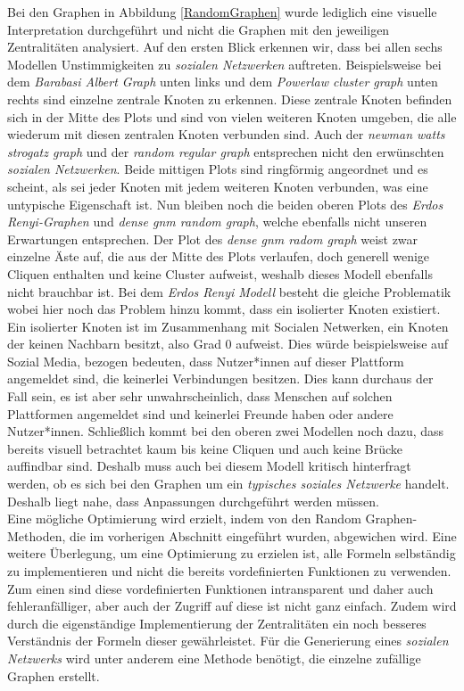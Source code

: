 Bei den Graphen in Abbildung \ref{RandomGraphen} wurde lediglich eine visuelle Interpretation durchgeführt und nicht die Graphen mit den jeweiligen Zentralitäten analysiert. Auf den ersten Blick erkennen wir, dass bei allen sechs Modellen Unstimmigkeiten zu \textit{sozialen Netzwerken} auftreten. Beispielsweise bei dem \textit{Barabasi Albert Graph} unten links und dem \textit{Powerlaw cluster graph} unten rechts sind einzelne zentrale Knoten zu erkennen. Diese zentrale Knoten befinden sich in der Mitte des Plots und sind von vielen weiteren Knoten umgeben, die alle wiederum mit diesen zentralen Knoten verbunden sind. Auch der \textit{newman watts strogatz graph} und der \textit{random regular graph} entsprechen nicht den erwünschten \textit{sozialen Netzwerken}. Beide mittigen Plots sind ringförmig angeordnet und es scheint, als sei jeder Knoten mit jedem weiteren Knoten verbunden, was eine untypische Eigenschaft ist. Nun bleiben noch die beiden oberen Plots des \textit{Erdos Renyi-Graphen} und \textit{dense gnm random graph}, welche ebenfalls nicht unseren Erwartungen entsprechen. Der Plot des \textit{dense gnm radom graph} weist zwar einzelne Äste auf, die aus der Mitte des Plots verlaufen, doch generell wenige Cliquen enthalten und keine Cluster aufweist, weshalb dieses Modell ebenfalls nicht brauchbar ist. Bei dem \textit{Erdos Renyi Modell} besteht die gleiche Problematik wobei hier noch das Problem hinzu kommt, dass ein isolierter Knoten existiert. Ein isolierter Knoten ist im Zusammenhang mit Socialen Netwerken, ein Knoten der keinen Nachbarn besitzt, also Grad $0$ aufweist.
Dies würde beispielsweise auf Sozial Media, bezogen bedeuten, dass Nutzer*innen auf dieser Plattform angemeldet sind, die keinerlei Verbindungen besitzen. Dies kann durchaus der Fall sein, es ist aber sehr unwahrscheinlich, dass Menschen auf solchen Plattformen angemeldet sind und keinerlei Freunde haben oder andere Nutzer*innen.
\newpage
Schließlich kommt bei den oberen zwei Modellen noch dazu, dass bereits visuell betrachtet kaum bis keine Cliquen und auch keine Brücke auffindbar sind. Deshalb muss auch bei diesem Modell kritisch hinterfragt werden, ob es sich bei den Graphen um ein \textit{typisches soziales Netzwerke} handelt. Deshalb liegt nahe, dass Anpassungen durchgeführt werden müssen.\\


Eine mögliche Optimierung wird erzielt, indem von den Random Graphen-Methoden, die im vorherigen Abschnitt eingeführt wurden, abgewichen wird. Eine weitere Überlegung, um eine Optimierung zu erzielen ist, alle Formeln selbständig zu implementieren und nicht die bereits vordefinierten Funktionen zu verwenden. Zum einen sind diese vordefinierten Funktionen intransparent und daher auch fehleranfälliger, aber auch der Zugriff auf diese ist nicht ganz einfach. Zudem wird durch die eigenständige Implementierung der Zentralitäten ein noch besseres Verständnis der Formeln dieser gewährleistet.
Für die Generierung eines \textit{sozialen Netzwerks} wird unter anderem eine Methode benötigt, die einzelne zufällige Graphen erstellt. 

